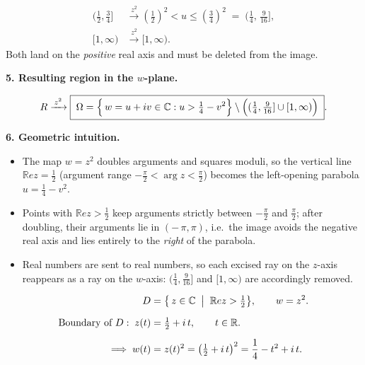 \documentclass[12pt]{article}
\theoremstyle{definition} %
\theoremstyle{plain} %
\begin{document}
  \[
  \begin{aligned}
     (\tfrac12,\tfrac34] &\xrightarrow{\,z^{2}\,}
         (\tfrac12)^{2}\!<u\le(\tfrac34)^{2}
         \;=\;(\tfrac14,\,\tfrac{9}{16}], \\[4pt]
     [1,\infty) &\xrightarrow{\,z^{2}\,} [1,\infty).
  \end{aligned}
  \]
  Both land on the \emph{positive} real axis and must be deleted
  from the image.
  
  \bigskip
  \textbf{5.  Resulting region in the \(w\)-plane.}
  
  \[
     R\xrightarrow{\,z^{2}\,}
     \boxed{\;\Omega
       =\Bigl\{\,w=u+iv\in\Bbb C:
                u>\tfrac14-v^{2}\Bigr\}
          \setminus\Bigl((\tfrac14,\tfrac{9}{16}]\cup[1,\infty)\Bigr)\; }.
  \]
  
  \medskip
  \textbf{6.  Geometric intuition.}
  \begin{itemize}
    \item The map \(w=z^{2}\) doubles arguments and squares moduli, so the
          vertical line \(\mathbb{R}e z=\tfrac12\) (argument range \(-\tfrac\pi2<\arg z<\tfrac\pi2\))
          becomes the left-opening parabola \(u=\tfrac14-v^{2}\).
    \item Points with \(\mathbb{R}e z>\tfrac12\) keep arguments strictly between
          \(-\tfrac\pi2\) and \(\tfrac\pi2\); after doubling, their arguments lie
          in \((-\,\pi,\pi)\), i.e.\ the image avoids the negative real axis and
          lies entirely to the \emph{right} of the parabola.
    \item Real numbers are sent to real numbers, so each excised ray on the
          \(z\)-axis reappears as a ray on the \(w\)-axis:
          \((\tfrac14,\tfrac{9}{16}]\) and \([1,\infty)\) are accordingly removed.
  \end{itemize}


\[
  \begin{aligned}
  D &= \bigl\{\,z\in\mathbb{C}\;\bigm|\; \mathbb{R}e z>\tfrac12 \bigr\}, 
  \qquad w=z^{2}. \\[6pt]
  \text{Boundary of }D: \;
  z(t) &= \tfrac12 + i\,t, \qquad t\in\mathbb{R}. \\[6pt]
  \Longrightarrow\;
  w(t) &= z(t)^{2}
        =\bigl(\tfrac12+i\,t\bigr)^{2}
        =\frac14 - t^{2} + i\,t .
  \end{aligned}
  \]
  
\end{document}
